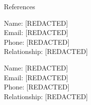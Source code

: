 \documentclass{resume} %
\begin{document}



\begin{rSection}{References}
\begin{multicols}{2}
Name: [REDACTED]\\
Email: [REDACTED]\\
Phone: [REDACTED]\\
Relationship: [REDACTED]

\columnbreak

Name: [REDACTED]\\
Email: [REDACTED]\\
Phone: [REDACTED]\\
Relationship: [REDACTED]

\end{multicols}
\end{rSection}






\end{document}
